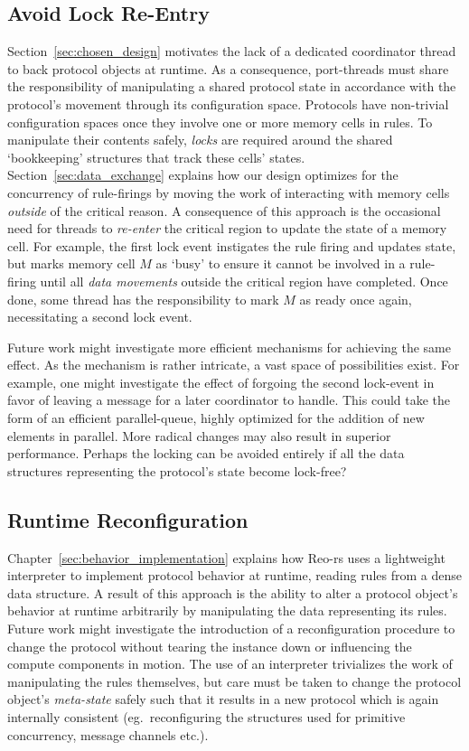 \subsection{Avoid Lock Re-Entry}
Section~\ref{sec:chosen_design} motivates the lack of a dedicated coordinator thread to back protocol objects at runtime. As a consequence, port-threads must share the responsibility of manipulating a shared protocol state in accordance with the protocol's movement through its configuration space. Protocols have non-trivial configuration spaces once they involve one or more memory cells in rules. To manipulate their contents safely, \textit{locks} are required around the shared `bookkeeping' structures that track these cells' states. Section~\ref{sec:data_exchange} explains how our design optimizes for the concurrency of rule-firings by moving the work of interacting with memory cells \textit{outside} of the critical reason. A consequence of this approach is the occasional need for threads to \textit{re-enter} the critical region to update the state of a memory cell. For example, the first lock event instigates the rule firing and updates state, but marks memory cell $M$ as `busy' to ensure it cannot be involved in a rule-firing until all \textit{data movements} outside the critical region have completed. Once done, some thread has the responsibility to mark $M$ as ready once again, necessitating a second lock event.

Future work might investigate more efficient mechanisms for achieving the same effect. As the mechanism is rather intricate, a vast space of possibilities exist. For example, one might investigate the effect of forgoing the second lock-event in favor of leaving a message for a later coordinator to handle. This could take the form of an efficient parallel-queue, highly optimized for the addition of new elements in parallel. More radical changes may also result in superior performance. Perhaps the locking can be avoided entirely if all the data structures representing the protocol's state become lock-free?

\subsection{Runtime Reconfiguration}
Chapter~\ref{sec:behavior_implementation} explains how Reo-rs uses a lightweight interpreter to implement protocol behavior at runtime, reading rules from a dense data structure. A result of this approach is the ability to alter a protocol object's behavior at runtime arbitrarily by manipulating the data representing its rules. Future work might investigate the introduction of a reconfiguration procedure to change the protocol without tearing the instance down or influencing the compute components in motion. The use of an interpreter trivializes the work of manipulating the rules themselves, but care must be taken to change the protocol object's \textit{meta-state} safely such that it results in a new protocol which is again internally consistent (eg.\ reconfiguring the structures used for primitive concurrency, message channels etc.).

